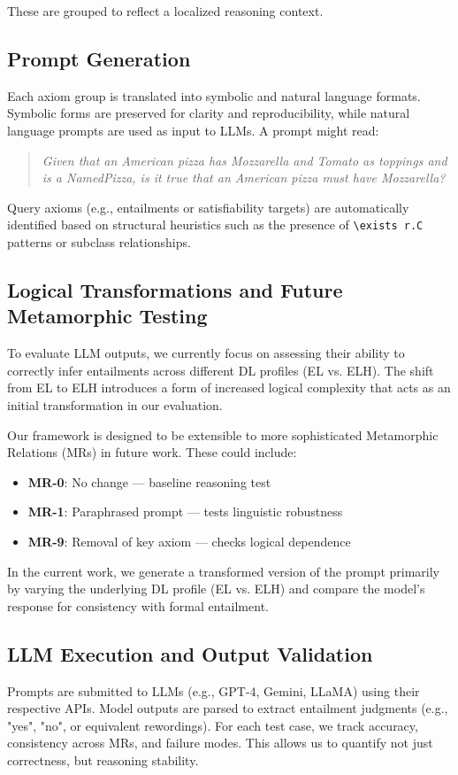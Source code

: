 \documentclass[11pt]{article}
\begin{document}
These are grouped to reflect a localized reasoning context.

\subsection{Prompt Generation}
Each axiom group is translated into symbolic and natural language formats. Symbolic forms are preserved for clarity and reproducibility, while natural language prompts are used as input to LLMs. A prompt might read:

\begin{quote}
\textit{Given that an American pizza has Mozzarella and Tomato as toppings and is a NamedPizza, is it true that an American pizza must have Mozzarella?}
\end{quote}

Query axioms (e.g., entailments or satisfiability targets) are automatically identified based on structural heuristics such as the presence of \texttt{\textbackslash exists r.C} patterns or subclass relationships.

\subsection{Logical Transformations and Future Metamorphic Testing}
To evaluate LLM outputs, we currently focus on assessing their ability to correctly infer entailments across different DL profiles (EL vs. ELH). The shift from EL to ELH introduces a form of increased logical complexity that acts as an initial transformation in our evaluation.

Our framework is designed to be extensible to more sophisticated Metamorphic Relations (MRs) in future work. These could include:
\begin{itemize}
    \item \textbf{MR-0}: No change — baseline reasoning test
    \item \textbf{MR-1}: Paraphrased prompt — tests linguistic robustness
    \item \textbf{MR-9}: Removal of key axiom — checks logical dependence
\end{itemize}

In the current work, we generate a transformed version of the prompt primarily by varying the underlying DL profile (EL vs. ELH) and compare the model’s response for consistency with formal entailment.

\subsection{LLM Execution and Output Validation}
Prompts are submitted to LLMs (e.g., GPT-4, Gemini, LLaMA) using their respective APIs. Model outputs are parsed to extract entailment judgments (e.g., "yes", "no", or equivalent rewordings). For each test case, we track accuracy, consistency across MRs, and failure modes. This allows us to quantify not just correctness, but reasoning stability.
\end{document}
